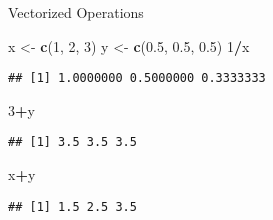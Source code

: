 \documentclass[ignorenonframetext,]{beamer}
\newenvironment{Shaded}{\begin{snugshade}}{\end{snugshade}}
\newcommand{\DecValTok}[1]{\textcolor[rgb]{0.00,0.00,0.81}{#1}}
\newcommand{\FloatTok}[1]{\textcolor[rgb]{0.00,0.00,0.81}{#1}}
\newcommand{\KeywordTok}[1]{\textcolor[rgb]{0.13,0.29,0.53}{\textbf{#1}}}
\newcommand{\NormalTok}[1]{#1}
\newcommand{\OperatorTok}[1]{\textcolor[rgb]{0.81,0.36,0.00}{\textbf{#1}}}
\newcommand{\StringTok}[1]{\textcolor[rgb]{0.31,0.60,0.02}{#1}}
\begin{document}
\begin{frame}[fragile]{Vectorized Operations}
\protect\hypertarget{vectorized-operations-2}{}

\begin{Shaded}
\begin{Highlighting}[]
\NormalTok{x <-}\StringTok{ }\KeywordTok{c}\NormalTok{(}\DecValTok{1}\NormalTok{, }\DecValTok{2}\NormalTok{, }\DecValTok{3}\NormalTok{)}
\NormalTok{y <-}\StringTok{ }\KeywordTok{c}\NormalTok{(}\FloatTok{0.5}\NormalTok{, }\FloatTok{0.5}\NormalTok{, }\FloatTok{0.5}\NormalTok{)}
\DecValTok{1}\OperatorTok{/}\NormalTok{x}
\end{Highlighting}
\end{Shaded}

\begin{verbatim}
## [1] 1.0000000 0.5000000 0.3333333
\end{verbatim}

\begin{Shaded}
\begin{Highlighting}[]
\DecValTok{3}\OperatorTok{+}\NormalTok{y}
\end{Highlighting}
\end{Shaded}

\begin{verbatim}
## [1] 3.5 3.5 3.5
\end{verbatim}

\begin{Shaded}
\begin{Highlighting}[]
\NormalTok{x}\OperatorTok{+}\NormalTok{y}
\end{Highlighting}
\end{Shaded}

\begin{verbatim}
## [1] 1.5 2.5 3.5
\end{verbatim}

\end{frame}
\end{document}
